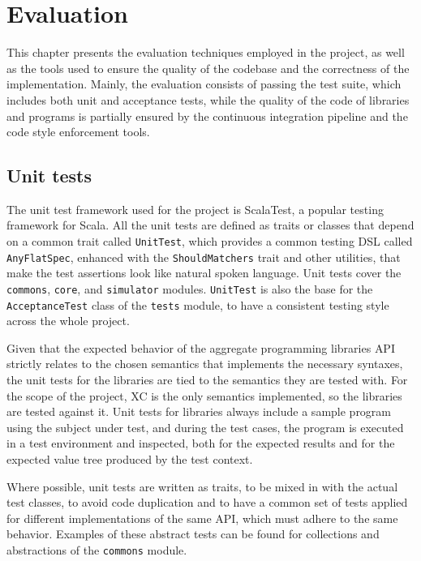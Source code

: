 \chapter{Evaluation}
\label{chap:evaluation}

This chapter presents the evaluation techniques employed in the project, as well as the tools used to ensure the quality of the codebase and the correctness of the implementation.
%
Mainly, the evaluation consists of passing the test suite, which includes both unit and acceptance tests, while the quality of the code of libraries and programs is partially ensured by the continuous integration pipeline and the code style enforcement tools.


\section{Unit tests}

The unit test framework used for the project is ScalaTest, a popular testing framework for Scala.
%
All the unit tests are defined as traits or classes that depend on a common trait called \texttt{UnitTest}, which provides a common testing \ac{DSL} called \texttt{AnyFlatSpec}, enhanced with the \texttt{ShouldMatchers} trait and other utilities, that make the test assertions look like natural spoken language.
%
Unit tests cover the \texttt{commons}, \texttt{core}, and \texttt{simulator} modules.
%
\texttt{UnitTest} is also the base for the \texttt{AcceptanceTest} class of the \texttt{tests} module, to have a consistent testing style across the whole project.

Given that the expected behavior of the aggregate programming libraries \ac{API} strictly relates to the chosen semantics that implements the necessary syntaxes, the unit tests for the libraries are tied to the semantics they are tested with.
%
For the scope of the project, \ac{XC} is the only semantics implemented, so the libraries are tested against it.
%
Unit tests for libraries always include a sample program using the subject under test, and during the test cases, the program is executed in a test environment and inspected, both for the expected results and for the expected value tree produced by the test context.

Where possible, unit tests are written as traits, to be mixed in with the actual test classes, to avoid code duplication and to have a common set of tests applied for different implementations of the same \ac{API}, which must adhere to the same behavior.
%
Examples of these abstract tests can be found for collections and abstractions of the \texttt{commons} module.


